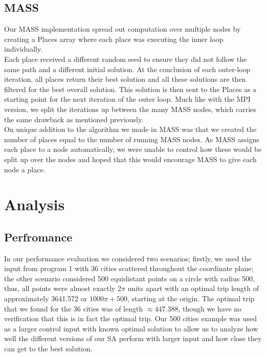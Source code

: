 \documentclass{article}
\begin{document}
		\subsection{MASS} \label{D_MASS}
			Our MASS implementation spread out computation over multiple nodes by creating a Places array where each place was executing the inner loop individually. \\
			
			Each place received a different random seed to ensure they did not follow the same path and a different initial solution. At the conclusion of each outer-loop iteration, all places return their best solution and all these solutions are then filtered for the best overall solution. This solution is then sent to the Places as a starting point for the next iteration of the outer loop. Much like with the MPI version, we split the iterations up between the many MASS nodes, which carries the same drawback as mentioned previously.\\
			
			On unique addition to the algorithm we made in MASS was that we created the number of places equal to the number of running MASS nodes. As MASS assigns each place to a node automatically, we were unable to control how these would be split up over the nodes and hoped that this would encourage MASS to give each node a place. \\

	
	\section{Analysis} \label{ANALYSIS}
        \subsection{Perfromance} \label{PERF}
            In our performance evaluation we considered two scenarios; firstly, we used the input from program 1 with 36 cities scattered throughout the coordinate plane; the other scenario considered 500 equidistant points on a circle with radius 500, thus, all points were almost exactly 2$\pi$ units apart with an optimal trip length of approximately 3641.572 or $1000\pi + 500$, starting at the origin. The optimal trip that we found for the 36 cities was of length $\approx 447.388$, though we have no verification that this is in fact the optimal trip. Our 500 cities example was used as a larger control input with known optimal solution to allow us to analyze how well the different versions of our SA perform with larger input and how close they can get to the best solution.\\
            
\end{document}
